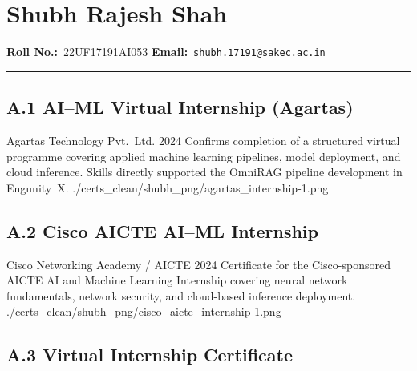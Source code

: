\clearpage
\section{Shubh Rajesh Shah}
\label{sec:certs-shubh}

\noindent\textbf{Roll No.:}~22UF17191AI053 \qquad
\textbf{Email:}~\texttt{shubh.17191@sakec.ac.in}

\vspace{0.4em}\noindent\rule{\linewidth}{0.4pt}\vspace{0.6em}

\subsection*{A.1 \quad AI--ML Virtual Internship (Agartas)}

\certentry
  {Agartas Technology Pvt.\ Ltd.}
  {2024}
  {Confirms completion of a structured virtual programme covering applied machine
   learning pipelines, model deployment, and cloud inference.
   Skills directly supported the OmniRAG pipeline development in Engunity~X.}
  {./certs_clean/shubh_png/agartas_internship-1.png}

\subsection*{A.2 \quad Cisco AICTE AI--ML Internship}

\certentry
  {Cisco Networking Academy / AICTE}
  {2024}
  {Certificate for the Cisco-sponsored AICTE AI and Machine Learning Internship
   covering neural network fundamentals, network security, and cloud-based
   inference deployment.}
  {./certs_clean/shubh_png/cisco_aicte_internship-1.png}

\subsection*{A.3 \quad Virtual Internship Certificate}

